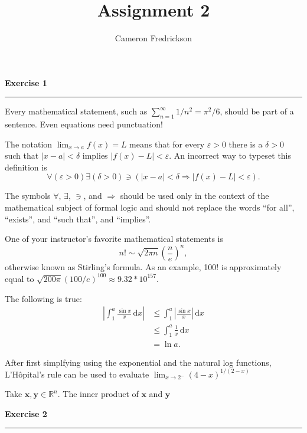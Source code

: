 \documentclass{article}
\title{Assignment 2}
\author{Cameron Fredrickson}
\date{}
\newcommand{\ud}{\, \mathrm{d}}
\begin{document}
\maketitle

\noindent \textbf{Exercise 1}

\noindent \rule{\textwidth}{.1mm}

Every mathematical statement, such as $ \sum_{n=1}^\infty 1/n^2 = \pi^2/6$, should be part of a sentence. Even equations need punctuation!

The notation $ \lim_{x \to a} f(x) = L$ means that for every $ \varepsilon > 0$ there is a $ \delta > 0$ such that $|x-a| < \delta$ implies $|f(x)-L| < \varepsilon$. An incorrect way to typeset this definition is \begin{equation*}
\forall \left( \varepsilon > 0 \right) \exists \left( \delta > 0 \right) \ni \left( |x-a| < \delta \Longrightarrow |f(x)-L| < \varepsilon \right).
\end{equation*}

The symbols $\forall$, $\exists$, $\ni$, and $\Longrightarrow$ should be used only in the context of the mathematical subject of formal logic and should not replace the words ``for all'', ``exists'', and ``such that'', and ``implies''.

One of your instructor's favorite mathematical statements is \begin{equation*}
n! \sim \sqrt{2 \pi n} \left( \frac{n}{e} \right)^{n},
\end{equation*} otherwise known as Stirling's formula. As an example,   100! is approximately equal to $ \sqrt{200 \pi} \left( 100/e \right)^{100} \approx 9.32 * 10^{157}.$

The following is true: \begin{align*}
\left| \int_1^a \frac{\sin x}{x} \ud x\right| &\leq \int_1^a \left|\frac{\sin x}{x}\right| \ud x \\
&\leq \int_1^a \frac{1}{x} \ud x \\
&= \ln a.
\end{align*}

After first simplfying using the exponential and the natural log functions, L'H\^opital's rule can be used to evaluate $ \lim_{x \to 2^-} (4-x)^{1/(2-x)}$%

Take $\mathbf{x, y} \in \mathbb{R}^n$. The inner product of $\mathbf{x}$ and $\mathbf{y}$

\noindent \textbf{Exercise 2}

\noindent \rule{\textwidth}{.1mm}
\end{document}
